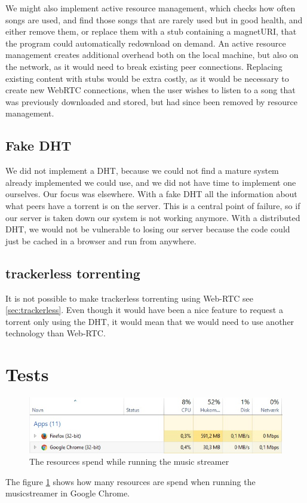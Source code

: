 We might also implement active resource management, which checks how often songs are used,
and find those songs that are rarely used but in good health, and either remove them,
or replace them with a stub containing a magnetURI, 
that the program could automatically redownload on demand.
An active resource management creates additional overhead both on the local machine,
but also on the network, as it would need to break existing peer connections.
Replacing existing content with stubs would be extra costly,
as it would be necessary to create new WebRTC connections,
when the user wishes to listen to a song that was previously downloaded and stored,
but had since been removed by resource management.

\subsection{Fake \acs{DHT}}
We did not implement a DHT, because we could not find a mature system already implemented we could use, and we did not have time to implement one ourselves.
Our focus was elsewhere.
With a fake \acs{DHT} all the information about what peers have a torrent is on the server. This is a central point of failure, so if our server is taken down our system is not working anymore.
With a distributed \acs{DHT}, we would not be vulnerable to losing our server because the code could just be cached in a browser and run from anywhere.
\subsection{trackerless torrenting}
It is not possible to make trackerless torrenting using Web-RTC see \ref{sec:trackerless}. Even though it would have been a nice feature to request a torrent only using the \acs{DHT}, it would mean that we would need to use another technology than Web-RTC. 

\section{Tests}
\begin{figure}[H]
	\centering
	\includegraphics[scale=0.4]{gfx/streamerIdle}
	\caption{The resources spend while running the music streamer}
	\label{fig:streamer-idle}
\end{figure}
The figure \ref{fig:streamer-idle} shows how many resources are spend when running the musicstreamer in Google Chrome.

